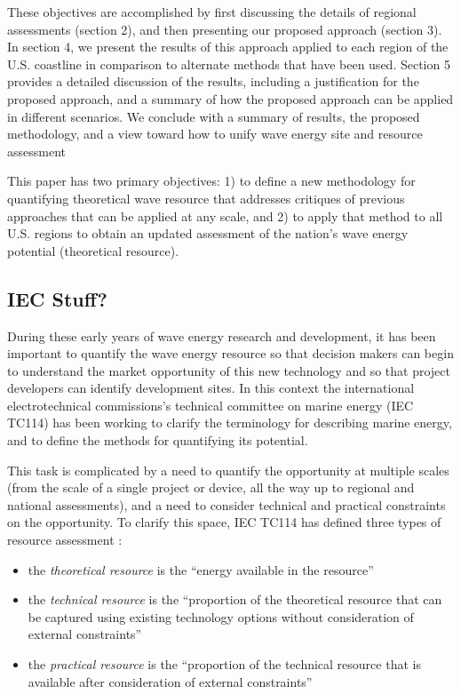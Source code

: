These objectives are accomplished by first discussing the details of regional assessments (section 2), and then presenting our proposed approach (section 3). In section 4, we present the results of this approach applied to each region of the U.S. coastline in comparison to alternate methods that have been used. Section 5 provides a detailed discussion of the results, including a justification for the proposed approach, and a summary of how the proposed approach can be applied in different scenarios. We conclude with a summary of results, the proposed methodology, and a view toward how to unify wave energy site and resource assessment

This paper has two primary objectives: 1) to define a new methodology for quantifying theoretical wave resource that addresses critiques of previous approaches that can be applied at any scale, and 2) to apply that method to all U.S. regions to obtain an updated assessment of the nation's wave energy potential (theoretical resource).

\subsection{IEC Stuff?}


During these early years of wave energy research and development, it has been
important to quantify the wave energy resource so that decision makers can begin
to understand the market opportunity of this new technology and so that project developers can identify development sites. In this context the international electrotechnical commissions's technical committee on marine energy (IEC TC114) has been working to clarify the terminology for describing marine energy, and to define the methods for quantifying its potential.

This task is complicated by a need to quantify the opportunity at multiple scales (from the scale of a single project or device, all the way up to regional and national assessments), and a need to consider technical and practical constraints on the opportunity. To clarify this space, IEC TC114 has defined three types of resource assessment
\citep{internationalelectrotechnicalcommissionPartTerminology2011} :

\begin{itemize}
  \item the {\it theoretical resource} is the ``energy available in the resource''
  \item the {\it technical resource} is the ``proportion of the theoretical resource that can be captured using existing technology options without consideration of external constraints''
  \item the {\it practical resource} is the ``proportion of the technical resource that is available after consideration of external constraints''
  \end{itemize}


